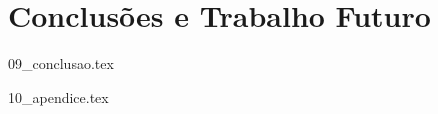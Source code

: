 \documentclass[
  oneside,
  11pt, a4paper,
  footinclude=true,
  headinclude=true,
  cleardoublepage=empty
]{scrbook}
\begin{document}

	\chapter{Conclusões e Trabalho Futuro}
    {09_conclusao.tex}
			

	

	
    {10_apendice.tex}
	
\end{document}
